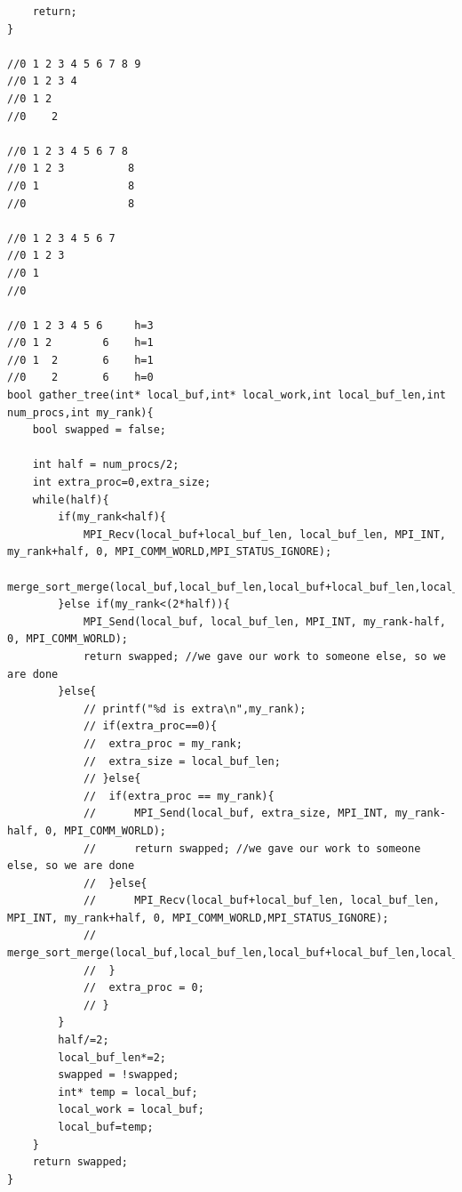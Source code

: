 \documentclass[12pt]{article}
\begin{document}
\begin{verbatim}
	return;
}

//0 1 2 3 4 5 6 7 8 9
//0 1 2 3 4
//0 1 2
//0    2

//0 1 2 3 4 5 6 7 8
//0 1 2 3          8
//0 1              8
//0                8

//0 1 2 3 4 5 6 7
//0 1 2 3
//0 1
//0

//0 1 2 3 4 5 6     h=3
//0 1 2        6    h=1
//0 1  2       6    h=1
//0    2       6    h=0
bool gather_tree(int* local_buf,int* local_work,int local_buf_len,int num_procs,int my_rank){
	bool swapped = false;

	int half = num_procs/2;
	int extra_proc=0,extra_size;
	while(half){
		if(my_rank<half){
			MPI_Recv(local_buf+local_buf_len, local_buf_len, MPI_INT, my_rank+half, 0, MPI_COMM_WORLD,MPI_STATUS_IGNORE);
			merge_sort_merge(local_buf,local_buf_len,local_buf+local_buf_len,local_buf_len,local_work);
		}else if(my_rank<(2*half)){
			MPI_Send(local_buf, local_buf_len, MPI_INT, my_rank-half, 0, MPI_COMM_WORLD);
			return swapped; //we gave our work to someone else, so we are done
		}else{
			// printf("%d is extra\n",my_rank);
			// if(extra_proc==0){
			// 	extra_proc = my_rank;
			// 	extra_size = local_buf_len;
			// }else{
			// 	if(extra_proc == my_rank){
			// 		MPI_Send(local_buf, extra_size, MPI_INT, my_rank-half, 0, MPI_COMM_WORLD);
			// 		return swapped; //we gave our work to someone else, so we are done
			// 	}else{
			// 		MPI_Recv(local_buf+local_buf_len, local_buf_len, MPI_INT, my_rank+half, 0, MPI_COMM_WORLD,MPI_STATUS_IGNORE);
			// 		merge_sort_merge(local_buf,local_buf_len,local_buf+local_buf_len,local_buf_len,local_work);
			// 	}
			// 	extra_proc = 0;
			// }
		}
		half/=2;
		local_buf_len*=2;
		swapped = !swapped;
		int* temp = local_buf;
		local_work = local_buf;
		local_buf=temp;
	}
	return swapped;
}
\end{verbatim}


\newpage
\clearpage
\end{document}

